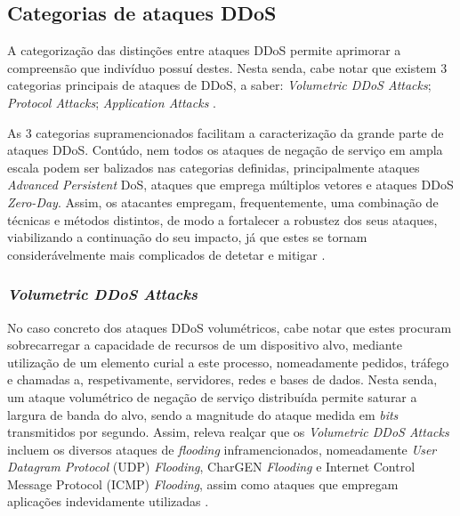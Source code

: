\subsection{Categorias de ataques DDoS}
A categorização das distinções entre ataques DDoS permite aprimorar a compreensão que indivíduo possuí destes. Nesta senda, cabe notar que existem 3 categorias principais de ataques de DDoS, a saber: \textit{Volumetric DDoS Attacks}; \textit{Protocol Attacks}; \textit{Application Attacks} \cite{esecurityplanet_types_of_ddos_attacks,connectwise_types_of_ddos_attacks}.

As 3 categorias supramencionados facilitam a caracterização da grande parte de ataques DDoS. Contúdo, nem todos os ataques de negação de serviço em ampla escala podem ser balizados nas categorias definidas, principalmente ataques \textit{Advanced Persistent} DoS, ataques que emprega múltiplos vetores e ataques DDoS \textit{Zero-Day}. Assim, os atacantes empregam, frequentemente, uma combinação de técnicas e métodos distintos, de modo a fortalecer a robustez dos seus ataques, viabilizando a continuação do seu impacto, já que estes se tornam considerávelmente mais complicados de detetar e mitigar \cite{esecurityplanet_types_of_ddos_attacks,connectwise_types_of_ddos_attacks}.

\subsubsection{\textit{Volumetric DDoS Attacks}}

No caso concreto dos ataques DDoS volumétricos, cabe notar que estes procuram sobrecarregar a capacidade de recursos de um dispositivo alvo, mediante utilização de um elemento curial a este processo, nomeadamente pedidos, tráfego e chamadas a, respetivamente, servidores, redes e bases de dados. Nesta senda, um ataque volumétrico de negação de serviço distribuída permite saturar a largura de banda do alvo, sendo a magnitude do ataque medida em \textit{bits} transmitidos por segundo. Assim, releva realçar que os \textit{Volumetric DDoS Attacks} incluem os diversos ataques de \textit{flooding} inframencionados, nomeadamente \textit{User Datagram Protocol} (UDP) \textit{Flooding}, CharGEN \textit{Flooding} e Internet Control Message Protocol (ICMP) \textit{Flooding}, assim como ataques que empregam aplicações indevidamente utilizadas \cite{esecurityplanet_types_of_ddos_attacks}.

